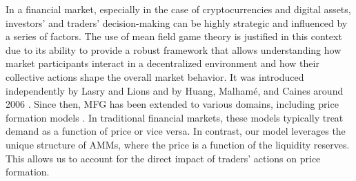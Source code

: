 \documentclass[11pt]{article}
\theoremstyle{definition}
\begin{document}
In a financial market, especially in the case of cryptocurrencies and digital assets, investors' and traders' decision-making can be highly strategic and influenced by a series of factors. The use of mean field game theory is justified in this context due to its ability to provide a robust framework that allows understanding how market participants interact in a decentralized environment and how their collective actions shape the overall market behavior. It was introduced independently by Lasry and Lions and by Huang, Malhamé, and Caines around 2006 \citep{huang2006largegames, lasry2007mfg}. Since then, MFG has been extended to various domains, including price formation models \citep{gomes2021mfgpriceformation, lions2016priceformation}. In traditional financial markets, these models typically treat demand as a function of price or vice versa. In contrast, our model leverages the unique structure of AMMs, where the price is a function of the liquidity reserves. This allows us to account for the direct impact of traders' actions on price formation.


\end{document}
